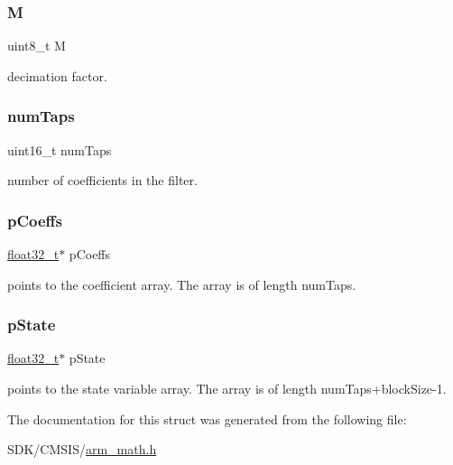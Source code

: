\subsubsection{\texorpdfstring{M}{M}}
{\footnotesize\ttfamily uint8\+\_\+t M}

decimation factor. \mbox{\label{structarm__fir__decimate__instance__f32_a751941891e47f522a7f5375fe8990aac}} 
\subsubsection{\texorpdfstring{num\+Taps}{numTaps}}
{\footnotesize\ttfamily uint16\+\_\+t num\+Taps}

number of coefficients in the filter. \mbox{\label{structarm__fir__decimate__instance__f32_aacbb8dd8eeba4b21fc2bb40076405ee3}} 
\subsubsection{\texorpdfstring{p\+Coeffs}{pCoeffs}}
{\footnotesize\ttfamily \mbox{\hyperlink{arm__math_8h_a4611b605e45ab401f02cab15c5e38715}{float32\+\_\+t}}$\ast$ p\+Coeffs}

points to the coefficient array. The array is of length num\+Taps. \mbox{\label{structarm__fir__decimate__instance__f32_a335c87e6fdc4b96601d95a5de8b9c463}} 
\subsubsection{\texorpdfstring{p\+State}{pState}}
{\footnotesize\ttfamily \mbox{\hyperlink{arm__math_8h_a4611b605e45ab401f02cab15c5e38715}{float32\+\_\+t}}$\ast$ p\+State}

points to the state variable array. The array is of length num\+Taps+block\+Size-\/1. 

The documentation for this struct was generated from the following file\+:\begin{DoxyCompactItemize}
\item 
S\+D\+K/\+C\+M\+S\+I\+S/\mbox{\hyperlink{arm__math_8h}{arm\+\_\+math.\+h}}\end{DoxyCompactItemize}
